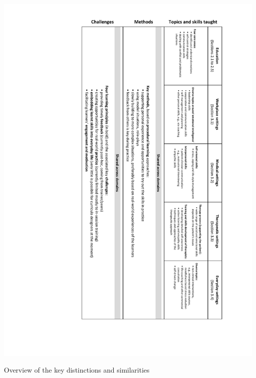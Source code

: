 \documentclass[prodmode,acmtochi]{acmsmall}
\begin{document}

\begin{table}
	\centering
				\includegraphics[height=\textheight]{images/SummaryResults}
				\caption{Overview of the key distinctions and similarities}
				\label{fig:SummaryResults}
\end{table}
%


\end{document}
